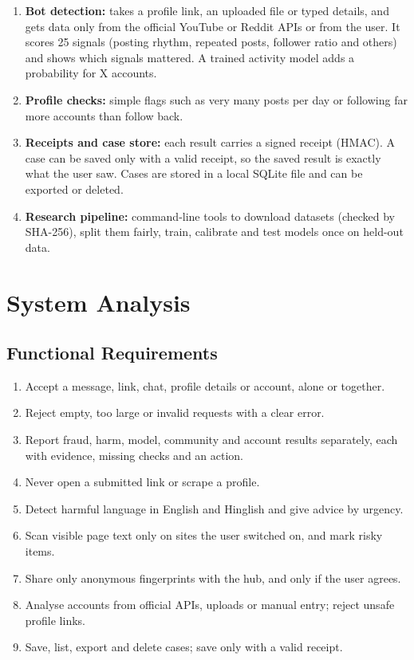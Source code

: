 \begin{enumerate}[label=\textbf{M\arabic*}, leftmargin=1.1cm]
\item \textbf{Bot detection:} takes a profile link, an uploaded file or typed details, and gets data only from the official YouTube or Reddit APIs or from the user. It scores 25 signals (posting rhythm, repeated posts, follower ratio and others) and shows which signals mattered. A trained activity model adds a probability for X accounts.
\item \textbf{Profile checks:} simple flags such as very many posts per day or following far more accounts than follow back.
\item \textbf{Receipts and case store:} each result carries a signed receipt (HMAC). A case can be saved only with a valid receipt, so the saved result is exactly what the user saw. Cases are stored in a local SQLite file and can be exported or deleted.
\item \textbf{Research pipeline:} command-line tools to download datasets (checked by SHA-256), split them fairly, train, calibrate and test models once on held-out data.
\end{enumerate}

\section{System Analysis}
\subsection{Functional Requirements}
\begin{enumerate}[label=FR\arabic*:, leftmargin=1.3cm]
\item Accept a message, link, chat, profile details or account, alone or together.
\item Reject empty, too large or invalid requests with a clear error.
\item Report fraud, harm, model, community and account results separately, each with evidence, missing checks and an action.
\item Never open a submitted link or scrape a profile.
\item Detect harmful language in English and Hinglish and give advice by urgency.
\item Scan visible page text only on sites the user switched on, and mark risky items.
\item Share only anonymous fingerprints with the hub, and only if the user agrees.
\item Analyse accounts from official APIs, uploads or manual entry; reject unsafe profile links.
\item Save, list, export and delete cases; save only with a valid receipt.
\end{enumerate}

